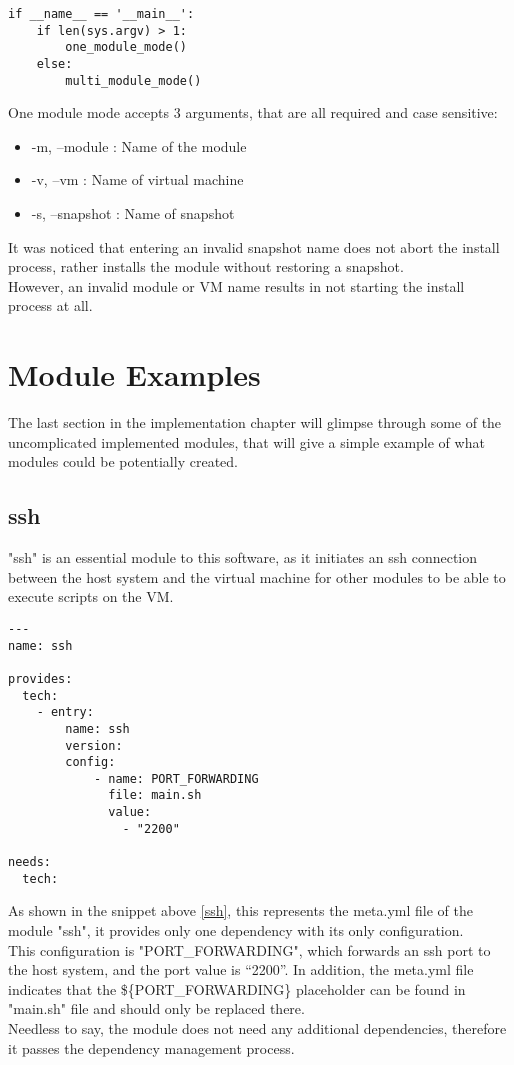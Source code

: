 \begin{lstlisting}[caption=One module function, style=pythonstyle, label=if_main]
if __name__ == '__main__':
    if len(sys.argv) > 1:
        one_module_mode()
    else:
        multi_module_mode()
\end{lstlisting}

One module mode accepts 3 arguments, that are all required and case sensitive:
\begin{itemize}
  \item -m, --module : Name of the module
  \item -v, --vm : Name of virtual machine
  \item -s, --snapshot : Name of snapshot
\end{itemize}


It was noticed that entering an invalid snapshot name does not abort the install process, rather installs the module without restoring a snapshot.\\
However, an invalid module or VM name results in not starting the install process at all.

\clearpage


\section{Module Examples}
The last section in the implementation chapter will glimpse through some of the uncomplicated implemented modules, that will give a simple example of what modules could be potentially created.

\subsection{ssh}
"ssh" is an essential module to this software, as it initiates an ssh connection between the host system and the virtual machine for other modules to be able to execute scripts on the VM.

\begin{lstlisting}[caption=ssh metadata, style=pythonstyle, label=ssh]
---
name: ssh

provides:
  tech:
    - entry:
        name: ssh
        version:
        config:
            - name: PORT_FORWARDING
              file: main.sh
              value:
                - "2200"

needs:
  tech:
\end{lstlisting}

As shown in the snippet above \ref{ssh}, this represents the meta.yml file of the module "ssh", it provides only one dependency with its only configuration.\\
This configuration is "PORT\_FORWARDING", which forwards an ssh port to the host system, and the port value is “2200”. In addition, the meta.yml file indicates that the \$\{PORT\_FORWARDING\} placeholder can be found in "main.sh" file and should only be replaced there.\\ Needless to say, the module does not need any additional dependencies, therefore it passes the dependency management process.

